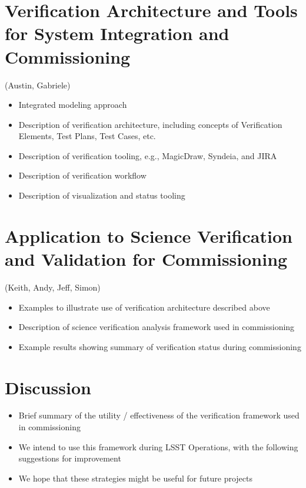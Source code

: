 \section{Verification Architecture and Tools for System Integration and Commissioning}

(Austin, Gabriele)

\begin{itemize}

\item Integrated modeling approach

\item Description of verification architecture, including concepts of Verification Elements, Test Plans, Test Cases, etc.

\item Description of verification tooling, e.g., MagicDraw, Syndeia, and JIRA

\item Description of verification workflow

\item Description of visualization and status tooling

\end{itemize}

\section{Application to Science Verification and Validation for Commissioning}

(Keith, Andy, Jeff, Simon)

\begin{itemize}

\item Examples to illustrate use of verification architecture described above

\item Description of science verification analysis framework used in commissioning

\item Example results showing summary of verification status during commissioning

\end{itemize}

\section{Discussion}

\begin{itemize}

\item Brief summary of the utility / effectiveness of the verification framework used in commissioning

\item We intend to use this framework during LSST Operations, with the following suggestions for improvement

\item We hope that these strategies might be useful for future projects

\end{itemize}
